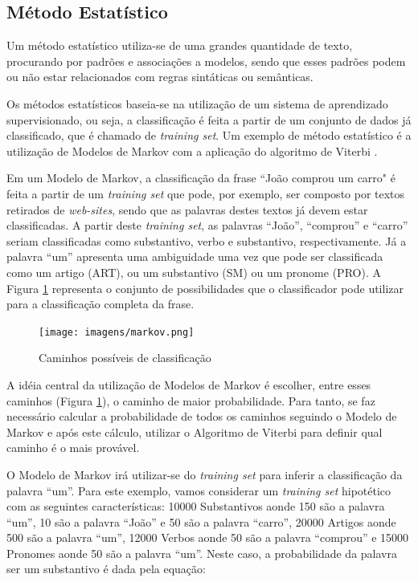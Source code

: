 \subsection{Método Estatístico}
Um método estatístico utiliza-se de uma grandes
quantidade de texto, procurando por padrões e
associações a modelos, sendo que esses padrões podem ou não estar relacionados
com regras sintáticas ou semânticas.

Os métodos estatísticos baseia-se na utilização de um sistema de aprendizado
supervisionado, ou seja, a classificação é feita a partir de um conjunto de dados já
classificado, que é chamado de \textit{training set}. Um exemplo de método
estatístico é a utilização de Modelos de Markov com a aplicação do algoritmo de
Viterbi \cite{manningschutze1999}.

Em um Modelo de Markov, a classificação da frase ``João comprou um
carro" é feita a partir de um \textit{training set} que pode, por exemplo, ser
composto por textos retirados de \textit{web-sites}, sendo que as palavras
destes textos já devem estar classificadas. A partir deste \textit{training
set}, as palavras ``João'', ``comprou'' e ``carro'' seriam classificadas como
substantivo, verbo e substantivo, respectivamente. Já a palavra ``um'' apresenta uma ambiguidade uma vez que pode
ser classificada como um artigo (ART), ou um substantivo (SM) ou um pronome
(PRO).
A Figura \ref{fig:markov} representa o conjunto de possibilidades que o
classificador pode utilizar para a classificação completa da frase.

\begin{figure}[htbp]
\centering
\texttt{[image: imagens/markov.png]}
\caption{Caminhos possíveis de classificação}
\label{fig:markov}
\end{figure}

A idéia central da utilização de Modelos de Markov é
escolher, entre esses caminhos (Figura \ref{fig:markov}), o caminho de maior
probabilidade. Para tanto, se faz necessário calcular a probabilidade de todos
os caminhos seguindo o Modelo de Markov e após este cálculo, utilizar o
Algoritmo de Viterbi para definir qual caminho é o mais provável.

O Modelo de Markov irá utilizar-se do \textit{training set} para inferir a
classificação da palavra ``um''. Para este exemplo, vamos considerar um
\textit{training set} hipotético com as seguintes características: 10000
Substantivos aonde 150 são a palavra ``um'', 10
são a palavra ``João'' e 50 são a palavra ``carro'', 20000 Artigos aonde 500 são
a palavra ``um'', 12000 Verbos aonde 50 são a palavra ``comprou'' e 15000
Pronomes aonde 50 são a palavra ``um''. Neste caso, a probabilidade da palavra
ser um substantivo é dada pela equação:

